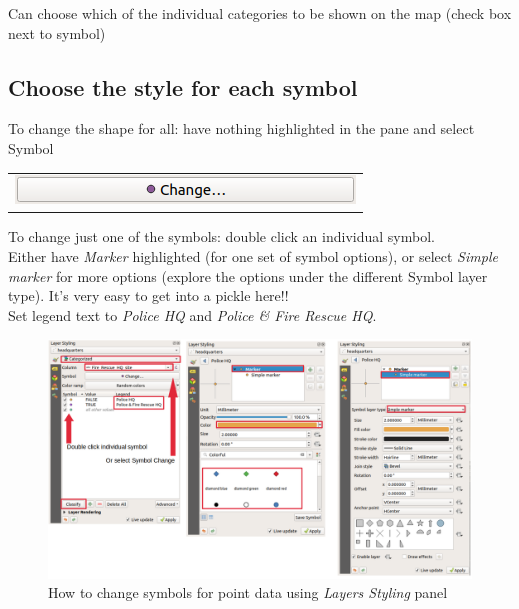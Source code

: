 Can choose which of the individual categories to be shown on the map (check box next to symbol)\\

\subsection{Choose the style for each symbol} 
To change the shape for all: have nothing highlighted in the pane and select Symbol \begin{tabular}{@{}c@{}}\includegraphics[width=26ex]{images/symbol_change_button.png}\end{tabular}

To change just one of the symbols: double click an individual symbol.\\

Either have \textit{Marker} highlighted (for one set of symbol options), or select \textit{Simple marker} for more options (explore the options under the different Symbol layer type). It's very easy to get into a pickle here!!\\%

Set legend text to \textit{Police HQ} and \textit{Police \& Fire Rescue HQ}.


\begin{figure}[!h]
	\centering
	\includegraphics[width=1\textwidth]{images/symbol_symbology.png}%
	\caption{How to change symbols for point data using \textit{Layers Styling} panel}
	\label{ft_fig_firstfig3}
\end{figure}

